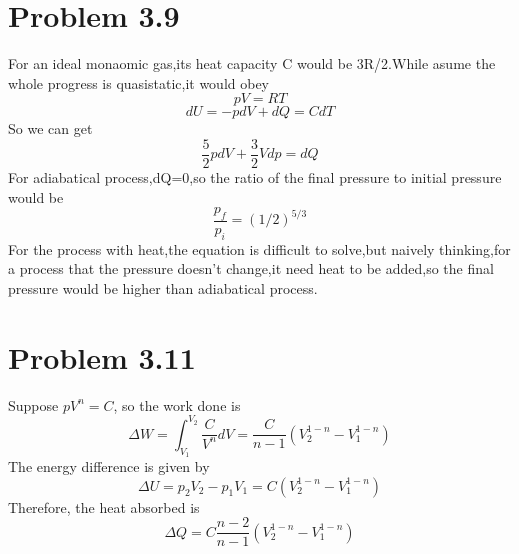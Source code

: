 \documentclass{article}
\begin{document}
 \section*{Problem 3.9}
 	For an ideal monaomic gas,its heat capacity C would be 3R/2.While asume the whole progress is quasistatic,it would obey 
 	\begin{equation*}
		pV=RT
	\end{equation*}
	\begin{equation*}
		dU=-pdV+dQ=CdT
	\end{equation*}
	So we can get
	\begin{equation*}
		\frac{5}{2}pdV+\frac{3}{2}Vdp=dQ
	\end{equation*}
	For adiabatical process,dQ=0,so the ratio of the final pressure to initial pressure would be
	\begin{equation*}
		\frac{p_f}{p_i}=(1/2)^{5/3}
	\end{equation*}
	For the process with heat,the equation is difficult to solve,but naively thinking,for a process that the pressure doesn't change,it need heat to be added,so the final pressure would be higher than adiabatical process.
	
	
\section*{Problem 3.11}
	Suppose $pV^{n} = C$, so the work done is
	\begin{equation}
	\Delta W = \int^{V_{2}}_{V_{1}} \frac{C}{V^{n}} dV = \frac{C}{n-1} (V^{1-n}_{2}	 - V^{1-n}_{1})
	\end{equation}
	The energy difference is given by
	\begin{equation}
	\Delta U = p_{2}V_{2} - p_{1}V_{1} = C (V^{1-n}_{2} - V^{1-n}_{1})
	\end{equation}
	Therefore, the heat absorbed is
	\begin{equation}
	\Delta Q =  C\frac{n-2}{n-1} (V^{1-n}_{2} - V^{1-n}_{1})
	\end{equation}
\end{document}
